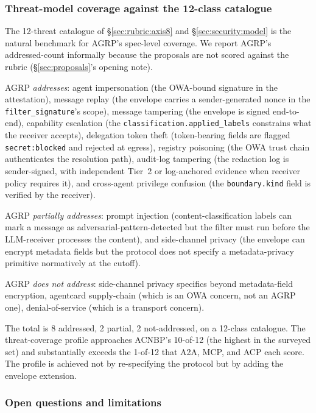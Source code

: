 \subsubsection{Threat-model coverage against the 12-class catalogue}
\label{sec:proposals:agrp:threat}

The 12-threat catalogue of \S\ref{sec:rubric:axis8} and
\S\ref{sec:security:model} is the natural benchmark for
AGRP's spec-level coverage. We report AGRP's
addressed-count informally because the proposals are
not scored against the rubric
(\S\ref{sec:proposals}'s opening note).

AGRP \emph{addresses}: agent impersonation (the OWA-bound
signature in the attestation), message replay (the
envelope carries a sender-generated nonce in the
\texttt{filter\_signature}'s scope), message tampering
(the envelope is signed end-to-end), capability
escalation (the \texttt{classification.applied\_labels}
constrains what the receiver accepts), delegation token
theft (token-bearing fields are flagged
\texttt{secret:blocked} and rejected at egress),
registry poisoning (the OWA trust chain authenticates
the resolution path), audit-log tampering (the
redaction log is sender-signed, with independent Tier~2
or log-anchored evidence when receiver policy requires it), and
cross-agent privilege confusion (the
\texttt{boundary.kind} field is verified by the
receiver).

AGRP \emph{partially addresses}: prompt injection
(content-classification labels can mark a message as
adversarial-pattern-detected but the filter must run
before the LLM-receiver processes the content), and
side-channel privacy (the envelope can encrypt
metadata fields but the protocol does not specify a
metadata-privacy primitive normatively at the cutoff).

AGRP \emph{does not address}: side-channel privacy
specifics beyond metadata-field encryption,
agentcard supply-chain (which is an OWA concern, not an
AGRP one), denial-of-service (which is a transport
concern).

The total is 8 addressed, 2 partial, 2 not-addressed,
on a 12-class catalogue. The threat-coverage profile
approaches ACNBP's 10-of-12 (the highest in the
surveyed set) and substantially exceeds the 1-of-12 that
A2A, MCP, and ACP each score. The profile is achieved not by
re-specifying the protocol but by adding the envelope
extension.

\subsubsection{Open questions and limitations}
\label{sec:proposals:agrp:open}

